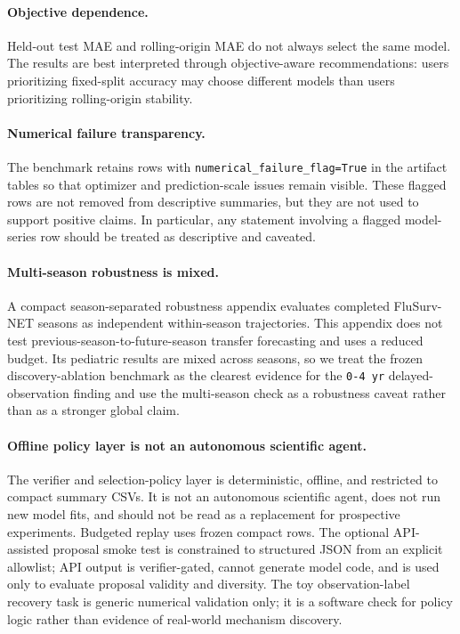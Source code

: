 \paragraph{Objective dependence.}
Held-out test MAE and rolling-origin MAE do not always select the same model.
The results are best interpreted through objective-aware recommendations:
users prioritizing fixed-split accuracy may choose different models than users
prioritizing rolling-origin stability.

\paragraph{Numerical failure transparency.}
The benchmark retains rows with \texttt{numerical\_failure\_flag=True} in the
artifact tables so that optimizer and prediction-scale issues remain visible.
These flagged rows are not removed from descriptive summaries, but they are
not used to support positive claims. In particular, any statement involving a
flagged model-series row should be treated as descriptive and caveated.

\paragraph{Multi-season robustness is mixed.}
A compact season-separated robustness appendix evaluates completed FluSurv-NET
seasons as independent within-season trajectories. This appendix does not test
previous-season-to-future-season transfer forecasting and uses a reduced
budget. Its pediatric results are mixed across seasons, so we treat the frozen
discovery-ablation benchmark as the clearest evidence for the \texttt{0-4 yr}
delayed-observation finding and use the multi-season check as a robustness
caveat rather than as a stronger global claim.

\paragraph{Offline policy layer is not an autonomous scientific agent.}
The verifier and selection-policy layer is deterministic, offline, and
restricted to compact summary CSVs. It is not an autonomous scientific agent,
does not run new model fits, and should not be read as a replacement for
prospective experiments. Budgeted replay uses frozen compact rows. The
optional API-assisted proposal smoke test is constrained to structured JSON
from an explicit allowlist; API output is verifier-gated, cannot generate
model code, and is used only to evaluate proposal validity and diversity. The
toy observation-label recovery task is generic numerical validation only; it
is a software check for policy logic rather than evidence of real-world
mechanism discovery.

